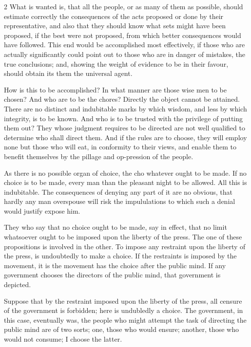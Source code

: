 \documentclass[10pt]{article}
\begin{document}
\begin{multicols}{2}
What is wanted is, that all the people, or as many of them as possible, should estimate correctly the consequences of the acts proposed or done by their representative, and also that they should know what sets might have been proposed, if the best were not proposed, from which better consequences would have followed. This end would be accomplished most effectively, if those who are actually significantly could point out to those who are in danger of mistakes, the true conclusions; and, showing the weight of evidence to be in their favour, should obtain its them the universal agent.

How is this to be accomplished? In what manner are those wise men to be chosen? And who are to be the chores? Directly the object cannot be attained. There are no distinct and indubitable marks by which wisdom, and less by which integrity, is to be known. And who is to be trusted with the privilege of putting them out? They whose judgment requires to be directed are not well qualified to determine who shall direct them. And if the rules are to choose, they will employ none but those who will eat, in conformity to their views, and enable them to benefit themselves by the pillage and op-pression of the people.

As there is no possible organ of choice, the cho whatever ought to be made. If no choice is to be made, every man than the pleasant night to be allowed. All this is indubitable. The consequences of denying any part of it are no obvious, that hardly any man overspouse will risk the impululations to which such a denial would justify expose him.

They who say that no choice ought to be made, say in effect, that no limit whatsoever ought to be imposed upon the liberty of the press. The one of these propositions is involved in the other. To impose any restraint upon the liberty of the press, is undoubtedly to make a choice. If the restraints is imposed by the movement, it is the movement has the choice after the public mind. If any government chooses the directors of the public mind, that government is depicted.

Suppose that by the restraint imposed upon the liberty of the press, all censure of the government is forbidden; here is undubledly a choice. The government, in this case, eventually was, the people who might attempt the task of directing the public mind are of two sorts; one, those who would ensure; another, those who would not consume; I choose the latter.


\end{multicols}
\end{document}
